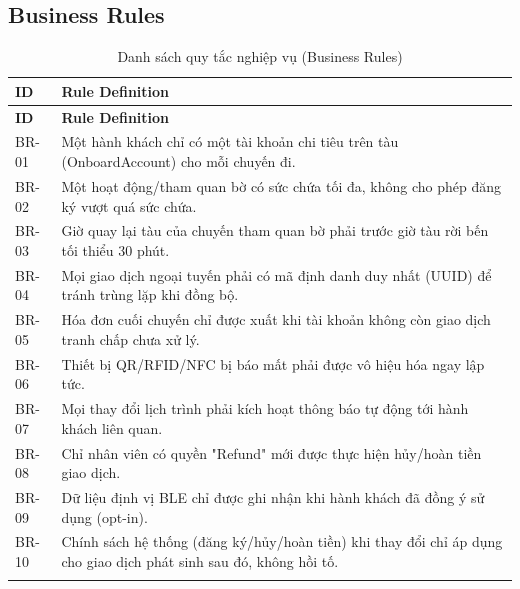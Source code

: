\subsection{Business Rules}

\begin{longtable}{|p{1.6cm}|p{12cm}|}
    \hline
    \textbf{ID} & \textbf{Rule Definition} \\
    \hline
    \endfirsthead
    \hline
    \textbf{ID} & \textbf{Rule Definition} \\
    \hline
    \endhead
    BR-01 & Một hành khách chỉ có một tài khoản chi tiêu trên tàu
    (OnboardAccount) cho mỗi chuyến đi. \\
    \hline
    BR-02 & Một hoạt động/tham quan bờ có sức chứa tối đa, không cho phép
    đăng ký vượt quá sức chứa. \\
    \hline
    BR-03 & Giờ quay lại tàu của chuyến tham quan bờ phải trước giờ tàu
    rời bến tối thiểu 30 phút. \\
    \hline
    BR-04 & Mọi giao dịch ngoại tuyến phải có mã định danh duy nhất (UUID)
    để tránh trùng lặp khi đồng bộ. \\
    \hline
    BR-05 & Hóa đơn cuối chuyến chỉ được xuất khi tài khoản không còn
    giao dịch tranh chấp chưa xử lý. \\
    \hline
    BR-06 & Thiết bị QR/RFID/NFC bị báo mất phải được vô hiệu hóa ngay
    lập tức. \\
    \hline
    BR-07 & Mọi thay đổi lịch trình phải kích hoạt thông báo tự động tới
    hành khách liên quan. \\
    \hline
    BR-08 & Chỉ nhân viên có quyền "Refund" mới được thực hiện hủy/hoàn
    tiền giao dịch. \\
    \hline
    BR-09 & Dữ liệu định vị BLE chỉ được ghi nhận khi hành khách đã đồng
    ý sử dụng (opt-in). \\
    \hline
    BR-10 & Chính sách hệ thống (đăng ký/hủy/hoàn tiền) khi thay đổi chỉ
    áp dụng cho giao dịch phát sinh sau đó, không hồi tố. \\
    \hline
    \caption{Danh sách quy tắc nghiệp vụ (Business Rules)}
    \label{tab:business-rules}
\end{longtable}

